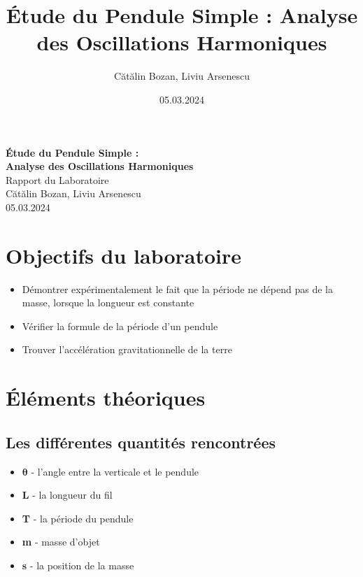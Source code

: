 \documentclass[12pt,a4paper]{article}
\title{Étude du Pendule Simple : Analyse des Oscillations Harmoniques}
\author{Cătălin Bozan, Liviu Arsenescu}
\date{05.03.2024}
\begin{document}
    \begin{titlepage}
        \begin{center}
            \vspace*{\fill}
            \Huge \textbf{Étude du Pendule Simple :} \\
            \Huge \textbf{Analyse des Oscillations Harmoniques} \\
            \Large Rapport du Laboratoire \\
            \vspace{\fill}
            \Large Cătălin Bozan, Liviu Arsenescu \\
            05.03.2024

            \vspace*{\fill}
        \end{center}
    \end{titlepage}
    \newpage

    \section{Objectifs du laboratoire}
    \begin{itemize}
        \item Démontrer expérimentalement le fait que la période ne dépend pas de la masse, lorsque la longueur est constante
        \item Vérifier la formule de la période d'un pendule
        \item Trouver l'accélération gravitationnelle de la terre
    \end{itemize}

    \section{Éléments théoriques}
    \subsection{Les différentes quantités rencontrées}
    \begin{itemize}
        \item $\bm{\theta}$ - l'angle entre la verticale et le pendule
        \item \textbf{L} - la longueur du fil
        \item \textbf{T} - la période du pendule
        \item \textbf{m} - masse d'objet
        \item \textbf{s} - la position de la masse
    \end{itemize}
\end{document}
